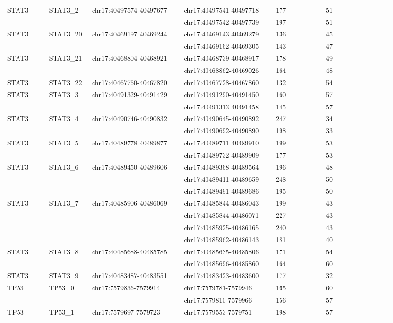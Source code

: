 \begin{landscape}
\begin{longtable}{p{0.1\linewidth}|p{0.1\linewidth}p{0.22\linewidth}p{0.22\linewidth}p{0.12\linewidth}p{0.16\linewidth}}
STAT3 & STAT3\_2 & chr17:40497574-40497677 & chr17:40497541-40497718 & 177 & 51
\\
 & & & chr17:40497542-40497739 & 197 & 51
\\
STAT3 & STAT3\_20 & chr17:40469197-40469244 & chr17:40469143-40469279 & 136 & 45
\\
 & & & chr17:40469162-40469305 & 143 & 47
\\
STAT3 & STAT3\_21 & chr17:40468804-40468921 & chr17:40468739-40468917 & 178 & 49
\\
 & & & chr17:40468862-40469026 & 164 & 48
\\
STAT3 & STAT3\_22 & chr17:40467760-40467820 & chr17:40467728-40467860 & 132 & 54
\\
STAT3 & STAT3\_3 & chr17:40491329-40491429 & chr17:40491290-40491450 & 160 & 57
\\
 & & & chr17:40491313-40491458 & 145 & 57
\\
STAT3 & STAT3\_4 & chr17:40490746-40490832 & chr17:40490645-40490892 & 247 & 34
\\
 & & & chr17:40490692-40490890 & 198 & 33
\\
STAT3 & STAT3\_5 & chr17:40489778-40489877 & chr17:40489711-40489910 & 199 & 53
\\
 & & & chr17:40489732-40489909 & 177 & 53
\\
STAT3 & STAT3\_6 & chr17:40489450-40489606 & chr17:40489368-40489564 & 196 & 48
\\
 & & & chr17:40489411-40489659 & 248 & 50
\\
 & & & chr17:40489491-40489686 & 195 & 50
\\
STAT3 & STAT3\_7 & chr17:40485906-40486069 & chr17:40485844-40486043 & 199 & 43
\\
 & & & chr17:40485844-40486071 & 227 & 43
\\
 & & & chr17:40485925-40486165 & 240 & 43
\\
 & & & chr17:40485962-40486143 & 181 & 40
\\
STAT3 & STAT3\_8 & chr17:40485688-40485785 & chr17:40485635-40485806 & 171 & 54
\\
 & & & chr17:40485696-40485860 & 164 & 60
\\
STAT3 & STAT3\_9 & chr17:40483487-40483551 & chr17:40483423-40483600 & 177 & 32
\\
\hline
TP53 & TP53\_0 & chr17:7579836-7579914 & chr17:7579781-7579946 & 165 & 60
\\
 & & & chr17:7579810-7579966 & 156 & 57
\\
TP53 & TP53\_1 & chr17:7579697-7579723 & chr17:7579553-7579751 & 198 & 57

\end{longtable}
\end{landscape}
